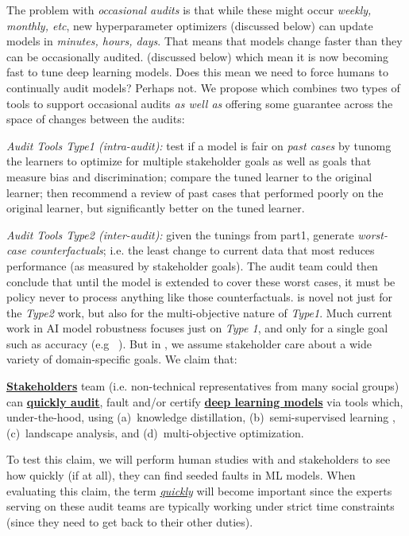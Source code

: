 The problem with   {\em occasional audits} is that while these might occur {\em weekly, monthly, etc}, 
new   hyperparameter optimizers (discussed below) can   update models in {\em minutes, hours, days}.
That means that models change faster than they can be occasionally audited.
(discussed below) which mean it is now becoming   fast to tune deep learning  models.
Does this mean we need to  force humans to continually audit models? Perhaps not.
We propose {\IT} which combines two types of tools to support  occasional  audits {\em as well as} offering some   guarantee
across the space of changes between the audits:  
\bi
\item {\em Audit Tools Type1 (intra-audit):}
  test if a  model is  fair on {\em past cases} by     tunomg the learners  to optimize for multiple stakeholder goals
as well as goals that measure bias and discrimination;
 compare the tuned learner to the original learner;  then recommend a review of   past cases that performed poorly on the original learner, but significantly better on the tuned learner. 
\item {\em Audit Tools Type2 (inter-audit):}
given the tunings from part1, generate {\em worst-case counterfactuals}; i.e. the least change to current data that most reduces performance (as measured by stakeholder goals).   The audit team could    then conclude  that until the model
is extended to cover these worst cases, it must be  policy   never to process  anything like those counterfactuals. 
\ei
{\IT} is novel not just for the {\em Type2} work, but also for the multi-objective nature of {\em Type1}.
Much current work in AI model
robustness focuses just on {\em Type 1}, and only for a single goal such as accuracy (e.g ~\cite{diffenderfer2021winning}).
But in {\IT}, we assume stakeholder care about  a wide variety of domain-specific goals.
We claim that:
\begin{formal}\noindent
 \underline{\bf Stakeholders}  team (i.e. non-technical representatives from  many
 social groups) can \underline{\bf quickly audit}, fault and/or certify   
 \underline{\bf deep learning
models}   via tools which, under-the-hood, using (a)~knowledge distillation, (b)~semi-supervised learning , (c)~landscape
analysis,   and  (d)~multi-objective optimization.\end{formal}
\noindent
 To test this claim, we will perform human studies with {\IT} and 
stakeholders to see how quickly (if at all), they can find seeded faults in ML models.
When evaluating this claim, the term \underline{\em quickly} will become important since 
the experts serving on these audit teams are typically working under strict time constraints
(since they need to get back to their other duties).  

